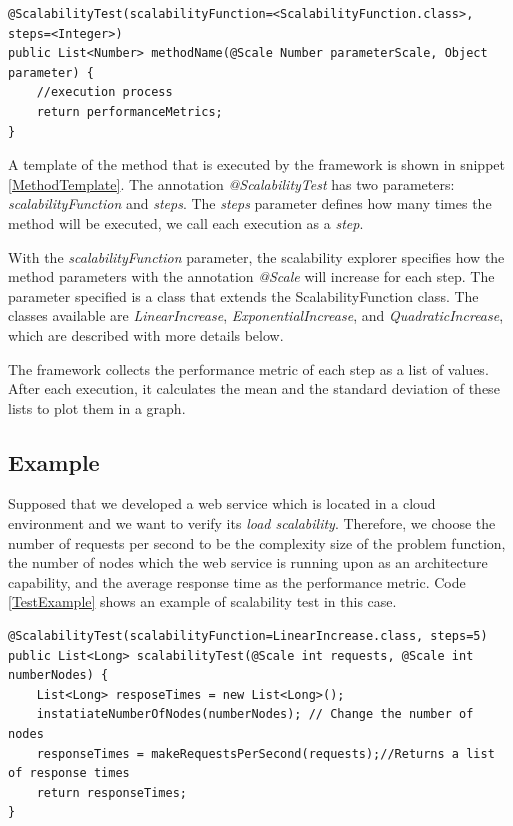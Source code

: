 \begin{lstlisting}
@ScalabilityTest(scalabilityFunction=<ScalabilityFunction.class>, steps=<Integer>)
public List<Number> methodName(@Scale Number parameterScale, Object parameter) {
	//execution process
	return performanceMetrics;
}

\end{lstlisting}

A template of the method that is executed by the framework is shown in snippet \ref{MethodTemplate}. The annotation \emph{@ScalabilityTest} has two parameters: \emph{scalabilityFunction} and \emph{steps}. The \emph{steps} parameter defines how many times the method will be executed, we call each execution as a \emph{step}.

With the \emph{scalabilityFunction} parameter, the scalability explorer specifies how the method parameters with the annotation \emph{@Scale} will increase for each step. The parameter specified is a class that extends the ScalabilityFunction class. The classes available are \emph{LinearIncrease}, \emph{ExponentialIncrease}, and \emph{QuadraticIncrease}, which are described with more details below.

The framework collects the performance metric of each step as a list of values. After each execution, it calculates the mean and the standard deviation of these lists to plot them in a graph.

\subsection{Example}

Supposed that we developed a web service which is located in a cloud environment and we want to verify its \emph{load scalability}. Therefore, we choose the number of requests per second to be the complexity size of the problem function, the number of nodes which the web service is running upon as an architecture capability, and the average response time as the performance metric. Code \ref{TestExample} shows an example of scalability test in this case.
\begin{lstlisting}
@ScalabilityTest(scalabilityFunction=LinearIncrease.class, steps=5)
public List<Long> scalabilityTest(@Scale int requests, @Scale int numberNodes) {
	List<Long> resposeTimes = new List<Long>();
	instatiateNumberOfNodes(numberNodes); // Change the number of nodes
	responseTimes = makeRequestsPerSecond(requests);//Returns a list of response times
	return responseTimes;
}
\end{lstlisting}

